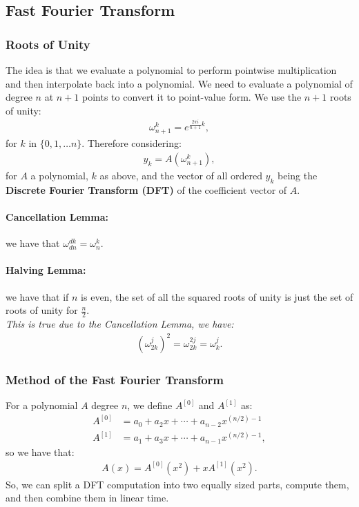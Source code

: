 \documentclass[a4paper, 12pt, twoside]{article}
\begin{document}
\subsection{Fast Fourier Transform}

\subsubsection{Roots of Unity}

The idea is that we evaluate a polynomial to perform pointwise
multiplication and then interpolate back into a polynomial.
We need to evaluate a polynomial of degree $n$ at $n + 1$ points to
convert it to point-value form. We use the $n + 1$ roots of unity:
\begin{gather*}
  \omega_{n+1}^k = e^{\frac{2\pi i}{n + 1}k},
\end{gather*} for $k$ in $\{0, 1, \ldots n\}$. Therefore considering:
\begin{gather*}
  y_k = A(\omega_{n + 1}^k),
\end{gather*} for $A$ a polynomial, $k$ as above, and the vector of 
all ordered $y_k$ being the \textbf{Discrete Fourier Transform (DFT)} 
of the coefficient vector of $A$.

\paragraph{Cancellation Lemma:} we have that 
$\omega_{dn}^{dk} = \omega_{n}^{k}$.

\paragraph{Halving Lemma:} we have that if $n$ is even, the set of all
the squared roots of unity is just the set of roots of unity for $\frac{n}{2}$.
\\[\baselineskip]
\textit{This is true due to the Cancellation Lemma, we have:} \begin{gather*}
  (\omega_{2k}^j)^2 = \omega_{2k}^{2j} = \omega_{k}^j.
\end{gather*}

\subsubsection{Method of the Fast Fourier Transform}

For a polynomial $A$ degree $n$, 
we define $A^{[0]}$ and $A^{[1]}$ as: \begin{align*}
  A^{[0]} &= a_0 + a_2x + \cdots + a_{n - 2}x^{(n / 2) - 1} \\
  A^{[1]} &= a_1 + a_3x + \cdots + a_{n - 1}x^{(n / 2) - 1},
\end{align*} so we have that: \begin{gather*}
  A(x) = A^{[0]}(x^2) + xA^{[1]}(x^2).
\end{gather*} So, we can split a DFT computation into two
equally sized parts, compute them, and then combine them in linear time.
\end{document}
